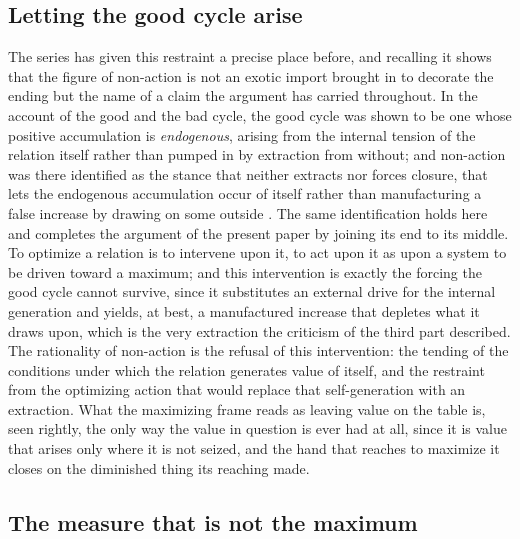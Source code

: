 \subsection*{Letting the good cycle arise}

The series has given this restraint a precise place before, and recalling it shows that the figure of non-action is not an exotic import brought in to decorate the ending but the name of a claim the argument has carried throughout. In the account of the good and the bad cycle, the good cycle was shown to be one whose positive accumulation is \emph{endogenous}, arising from the internal tension of the relation itself rather than pumped in by extraction from without; and non-action was there identified as the stance that neither extracts nor forces closure, that lets the endogenous accumulation occur of itself rather than manufacturing a false increase by drawing on some outside \parencite{paperix}. The same identification holds here and completes the argument of the present paper by joining its end to its middle. To optimize a relation is to intervene upon it, to act upon it as upon a system to be driven toward a maximum; and this intervention is exactly the forcing the good cycle cannot survive, since it substitutes an external drive for the internal generation and yields, at best, a manufactured increase that depletes what it draws upon, which is the very extraction the criticism of the third part described. The rationality of non-action is the refusal of this intervention: the tending of the conditions under which the relation generates value of itself, and the restraint from the optimizing action that would replace that self-generation with an extraction. What the maximizing frame reads as leaving value on the table is, seen rightly, the only way the value in question is ever had at all, since it is value that arises only where it is not seized, and the hand that reaches to maximize it closes on the diminished thing its reaching made.

\subsection*{The measure that is not the maximum}

